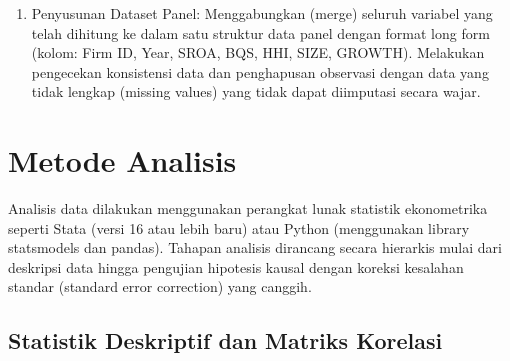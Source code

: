 \documentclass[12pt,a4paper]{report}
\providecommand{\tightlist}{%
  \setlength{\itemsep}{0pt}\setlength{\parskip}{0pt}%
}
\begin{document}
\begin{enumerate}
  \begin{itemize}
  \tightlist
  \item
    Perhitungan Rasio: Menghitung rasio ROA, Gross Margin, Owner
    Earnings, dan Leverage untuk setiap observasi (perusahaan-tahun).
  \item
    Klasifikasi Industri: Menetapkan kode GICS yang relevan untuk setiap
    perusahaan pada setiap tahun. Perlu diperhatikan bahwa perusahaan
    dapat berpindah sektor (misal: perpindahan Visa/Mastercard dari
    Financials ke IT lalu ke Financials lagi, atau perubahan definisi
    sektor GICS pada 2018). Data HHI harus dihitung berdasarkan
    klasifikasi yang berlaku pada tahun tersebut.
  \item
    Perhitungan HHI Dinamis: Menghitung total penjualan industri
    (SALESj,t) dengan menjumlahkan penjualan seluruh perusahaan dalam
    kode industri yang sama pada tahun tersebut. Kemudian menghitung
    pangsa pasar masing-masing perusahaan dan menjumlahkan kuadratnya
    untuk mendapatkan HHI.
  \item
    Standardisasi BQS: Melakukan perhitungan mean dan standar deviasi
    untuk setiap komponen BQS secara cross-sectional per tahun,
    menghitung Z-score, dan merata-ratakannya menjadi BQS.
  \end{itemize}
\item
  Penyusunan Dataset Panel: Menggabungkan (merge) seluruh variabel yang
  telah dihitung ke dalam satu struktur data panel dengan format long
  form (kolom: Firm ID, Year, SROA, BQS, HHI, SIZE, GROWTH). Melakukan
  pengecekan konsistensi data dan penghapusan observasi dengan data yang
  tidak lengkap (missing values) yang tidak dapat diimputasi secara
  wajar.
\end{enumerate}

\hypertarget{metode-analisis}{%
\section{Metode Analisis}\label{metode-analisis}}

Analisis data dilakukan menggunakan perangkat lunak statistik
ekonometrika seperti Stata (versi 16 atau lebih baru) atau Python
(menggunakan library statsmodels dan pandas). Tahapan analisis dirancang
secara hierarkis mulai dari deskripsi data hingga pengujian hipotesis
kausal dengan koreksi kesalahan standar (standard error correction) yang
canggih.

\hypertarget{statistik-deskriptif-dan-matriks-korelasi}{%
\subsection{Statistik Deskriptif dan Matriks
Korelasi}\label{statistik-deskriptif-dan-matriks-korelasi}}
\end{document}
